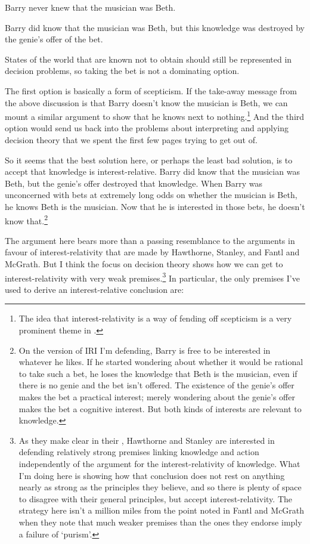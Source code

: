 \documentclass[11pt,oneside]{book}
\begin{document}
\begin{enumerate*}
\item Barry never knew that the musician was Beth.
\item Barry did know that the musician was Beth, but this knowledge was destroyed by the genie's offer of the bet.
\item States of the world that are known not to obtain should still be represented in decision problems, so taking the bet is not a dominating option.
\end{enumerate*}

\noindent The first option is basically a form of scepticism. If the take-away message from the above discussion is that Barry doesn't know the musician is Beth, we can mount a similar argument to show that he knows next to nothing.\footnote{The idea that interest-relativity is a way of fending off scepticism is a very prominent theme in \cite{FantlMcGrath2009}.} And the third option would send us back into the problems about interpreting and applying decision theory that we spent the first few pages trying to get out of.

So it seems that the best solution here, or perhaps the least bad solution, is to accept that knowledge is interest-relative. Barry did know that the musician was Beth, but the genie's offer destroyed that knowledge. When Barry was unconcerned with bets at extremely long odds on whether the musician is Beth, he knows Beth is the musician. Now that he is interested in those bets, he doesn't know that.\footnote{On the version of IRI I'm defending, Barry is free to be interested in whatever he likes. If he started wondering about whether it would be rational to take such a bet, he loses the knowledge that Beth is the musician, even if there is no genie and the bet isn't offered. The existence of the genie's offer makes the bet a practical interest; merely wondering about the genie's offer makes the bet a cognitive interest. But both kinds of interests are relevant to knowledge.}

The argument here bears more than a passing resemblance to the arguments in favour of interest-relativity that are made by Hawthorne, Stanley, and Fantl and McGrath. But I think the focus on decision theory shows how we can get to interest-relativity with very weak premises.\footnote{As they make clear in their \citeyearpar{Hawthorne2008-HAWKAA}, Hawthorne and Stanley are interested in defending relatively strong premises linking knowledge and action independently of the argument for the interest-relativity of knowledge. What I'm doing here is showing how that conclusion does not rest on anything nearly as strong as the principles they believe, and so there is plenty of space to disagree with their general principles, but accept interest-relativity. The strategy here isn't a million miles from the point noted in Fantl and McGrath \citeyearpar[72n14]{FantlMcGrath2009} when they note that much weaker premises than the ones they endorse imply a failure of `purism'.} In particular, the only premises I've used to derive an interest-relative conclusion are:
\end{document}
